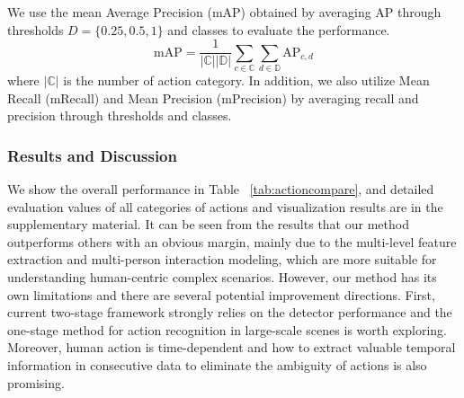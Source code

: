 


We use the mean Average Precision (mAP) obtained by averaging AP through thresholds $D =  \{0.25, 0.5, 1\}$ and classes to evaluate the performance.
$$
\mathrm{mAP}=\frac{1}{|\mathbb{C}||\mathbb{D}|} \sum_{c \in \mathbb{C}} \sum_{d \in \mathbb{D}} \mathrm{AP}_{c, d}
$$
where $|\mathbb{C}|$ is the number of action category.
In addition, we also utilize Mean Recall (mRecall) and Mean Precision (mPrecision) by averaging recall and precision through thresholds and classes.

\subsubsection{Results and Discussion}
We show the overall performance in Table ~\ref{tab:actioncompare}, and detailed evaluation values of all categories of actions and visualization results are in the supplementary material. It can be seen from the results that our method outperforms others with an obvious margin, mainly due to the multi-level feature extraction and multi-person interaction modeling, which are more suitable for understanding human-centric complex scenarios. However, our method has its own limitations and there are several potential improvement directions. First, current two-stage framework strongly relies on the detector performance and the one-stage method for action recognition in large-scale scenes is worth exploring. Moreover, human action is time-dependent and how to extract valuable temporal information in consecutive data to eliminate the ambiguity of actions is also promising.  



